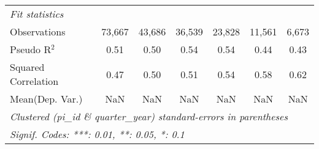 \begin{tabular}{lcccccc}
   \midrule
   \emph{Fit statistics}\\
   Observations                                               & 73,667       & 43,686  & 36,539        & 23,828       & 11,561        & 6,673\\  
   Pseudo R$^2$                                               & 0.51         & 0.50    & 0.54          & 0.54         & 0.44          & 0.43\\  
   Squared Correlation                                        & 0.47         & 0.50    & 0.51          & 0.54         & 0.58          & 0.62\\  
Mean(Dep. Var.) & NaN & NaN & NaN & NaN & NaN & NaN \\
   \midrule \midrule
   \multicolumn{7}{l}{\emph{Clustered (pi\_id \& quarter\_year) standard-errors in parentheses}}\\
   \multicolumn{7}{l}{\emph{Signif. Codes: ***: 0.01, **: 0.05, *: 0.1}}\\
\end{tabular}
\par\endgroup
